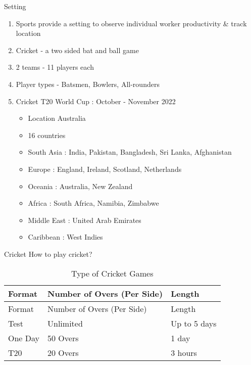 \documentclass[
  10pt,
  ignorenonframetext,
  twocolumn]{beamer}
\providecommand{\tightlist}{%
  \setlength{\itemsep}{0pt}\setlength{\parskip}{0pt}}
\begin{document}
\begin{frame}{Setting}
\protect\hypertarget{setting}{}
\begin{enumerate}
\item
  Sports provide a setting to observe individual worker productivity \&
  track location
\item
  Cricket - a two sided bat and ball game
\item
  2 teams - 11 players each
\item
  Player types - Batsmen, Bowlers, All-rounders
\item
  Cricket T20 World Cup : October - November 2022

  \begin{itemize}
  \tightlist
  \item
    Location Australia
  \item
    16 countries
  \item
    South Asia : India, Pakistan, Bangladesh, Sri Lanka, Afghanistan
  \item
    Europe : England, Ireland, Scotland, Netherlands
  \item
    Oceania : Australia, New Zealand
  \item
    Africa : South Africa, Namibia, Zimbabwe
  \item
    Middle East : United Arab Emirates
  \item
    Caribbean : West Indies
  \end{itemize}
\end{enumerate}
\end{frame}

\begin{frame}{Cricket}
\protect\hypertarget{cricket}{}
How to play cricket?

\begin{longtable}[]{@{}lll@{}}
\caption{Type of Cricket Games}\tabularnewline
\toprule()
Format & Number of Overs (Per Side) & Length \\
\midrule()
\endfirsthead
\toprule()
Format & Number of Overs (Per Side) & Length \\
\midrule()
\endhead
Test & Unlimited & Up to 5 days \\
One Day & 50 Overs & 1 day \\
T20 & 20 Overs & 3 hours \\
\bottomrule()
\end{longtable}
\end{frame}
\end{document}
